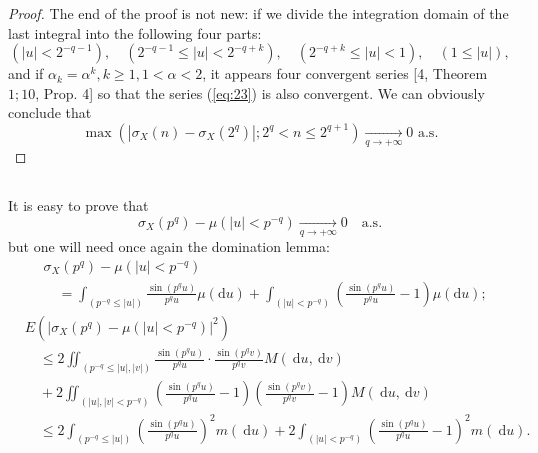 \documentclass{article}
\theoremstyle{definition}
\begin{document}
\begin{proof}
The end of the proof is not new: if we divide the integration domain of the last integral into the following four parts:
\begin{equation}\label{eq:24}
\left(|u|<2^{-q-1}\right), \quad\left(2^{-q-1} \leqslant|u|<2^{-q+k}\right), \quad\left(2^{-q+k} \leqslant|u|<1\right), \quad(1 \leqslant|u|),
\end{equation}
and if $\alpha_{k}=\alpha^{k}, k \geqslant 1,1<\alpha<2$, it appears four convergent series [4, Theorem $1 ; 10$, Prop. 4] so that the series (\ref{eq:23}) is also convergent. We can obviously conclude that
\begin{equation}\label{eq:25}
\max \left(\left|\sigma_{X}(n)-\sigma_{X}\left(2^{q}\right)\right| ; 2^{q}<n \leqslant 2^{q+1}\right) \underset{q \rightarrow+\infty}{\longrightarrow} 0 \text{ a.s.}
\end{equation}
\end{proof}

\subsection{}

It is easy to prove that
\begin{equation}\label{eq:26}
\sigma_{X}\left(p^{q}\right)-\mu\left(|u|<p^{-q}\right) \underset{q \rightarrow+\infty}{\longrightarrow} 0 \quad \text{a.s.}
\end{equation}
but one will need once again the domination lemma:
\begin{equation}\label{eq:27}
\begin{aligned}
&\sigma_{X}\left(p^{q}\right)-\mu\left(|u|<p^{-q}\right) \\
&\quad=\int_{\left(p^{-q} \leqslant|u|\right)} \frac{\sin \left(p^{q} u\right)}{p^{q} u} \mu(\mathrm{d} u)+\int_{\left(|u|<p^{-q}\right)}\left(\frac{\sin \left(p^{q} u\right)}{p^{q} u}-1\right) \mu(\mathrm{d} u);
\end{aligned}
\end{equation}
\begin{equation}\label{eq:28}
\begin{aligned}
&E\left(\left|\sigma_{X}\left(p^{q}\right)-\mu\left(|u|<p^{-q}\right)\right|^{2}\right) \\
&\quad \leqslant 2 \iint_{\left(p^{-q} \leqslant|u|,|v|\right)} \frac{\sin \left(p^{q} u\right)}{p^{q} u} \cdot \frac{\sin \left(p^{q} v\right)}{p^{q} v} M(\mathrm{~d} u, \mathrm{~d} v) \\
&\quad+2 \iint_{\left(|u|,|v|<p^{-q}\right)}\left(\frac{\sin \left(p^{q} u\right)}{p^{q} u}-1\right)\left(\frac{\sin \left(p^{q} v\right)}{p^{q} v}-1\right) M(\mathrm{~d} u, \mathrm{~d} v) \\
&\quad\leqslant 2 \int_{\left(p^{-q} \leqslant|u|\right)}\left(\frac{\sin \left(p^{q} u\right)}{p^{q} u}\right)^{2} m(\mathrm{~d} u)+2 \int_{\left(|u|<p^{-q}\right)}\left(\frac{\sin \left(p^{q} u\right)}{p^{q} u}-1\right)^{2} m(\mathrm{~d} u).
\end{aligned}
\end{equation}
\end{document}
